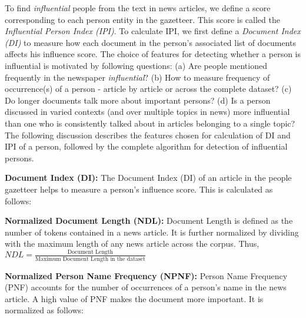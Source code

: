 To find \emph{influential} people from the text in news articles, we define a score corresponding to each person entity in the gazetteer. This score is called the \emph{Influential Person Index (IPI)}. To calculate IPI, we first define a \emph{Document Index (DI)} to measure how each document in the person's associated list of documents affects his influence score. The choice of features for detecting whether a person is influential is motivated by following questions: (a) Are people mentioned frequently in the newspaper \emph{influential}? (b) How to measure frequency of occurrence(s) of a person - article by article or across the complete dataset? (c) Do longer documents talk more about important persons? (d) Is a person discussed in varied contexts (and over multiple topics in news) more influential than one who is consistently talked about in articles belonging to a single topic?  The following discussion describes the features chosen for calculation of DI and IPI of a person, followed by the complete algorithm for detection of influential persons.

\noindent \textbf{Document Index (DI): }
The Document Index (DI) of an article in the people gazetteer helps to measure a person's influence score. This is calculated as follows:

\noindent \textbf{Normalized Document Length (NDL): } 
Document Length is defined as the number of tokens contained in a news article. It is further normalized by dividing with the maximum length of any news article across the corpus. Thus,  
$NDL= \frac{\text{Document Length}} {\text{Maximum Document Length in the dataset}}$


\noindent \textbf{ Normalized Person Name Frequency (NPNF): }
Person Name Frequency (PNF) accounts for the number of occurrences of a person's name in the news article. A high value of PNF makes the document more important. It is normalized as follows:

